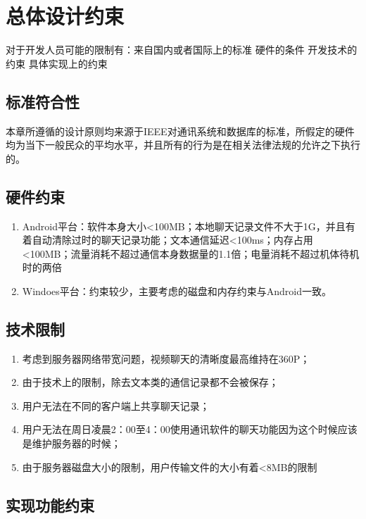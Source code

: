 \chapter{总体设计约束}


对于开发人员可能的限制有：来自国内或者国际上的标准
硬件的条件
开发技术的约束
具体实现上的约束
 
\section{标准符合性}


本章所遵循的设计原则均来源于IEEE对通讯系统和数据库的标准，所假定的硬件均为当下一般民众的平均水平，并且所有的行为是在相关法律法规的允许之下执行的。


\section{硬件约束}

\begin{enumerate}
	\item Android平台：软件本身大小<100MB；本地聊天记录文件不大于1G，并且有着自动清除过时的聊天记录功能；文本通信延迟<100ms；内存占用<100MB；流量消耗不超过通信本身数据量的1.1倍；电量消耗不超过机体待机时的两倍
	\item Windoes平台：约束较少，主要考虑的磁盘和内存约束与Android一致。
\end{enumerate}

\section{技术限制}

\begin{enumerate}
	\item 考虑到服务器网络带宽问题，视频聊天的清晰度最高维持在360P；
	\item 
	由于技术上的限制，除去文本类的通信记录都不会被保存；
	\item
	用户无法在不同的客户端上共享聊天记录；
	\item
	用户无法在周日凌晨2：00至4：00使用通讯软件的聊天功能因为这个时候应该是维护服务器的时候；
	\item 
	由于服务器磁盘大小的限制，用户传输文件的大小有着<8MB的限制
	
\end{enumerate}

\section{实现功能约束}
